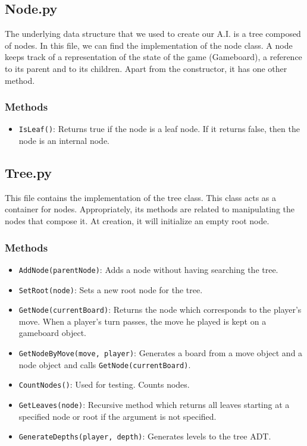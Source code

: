 \documentclass[10pt]{article}
\begin{document}
\subsection{Node.py}
The underlying data structure that we used to create our A.I. is a tree composed of nodes. In this file, we can find the implementation of the node class. A node keeps track of a representation of the state of the game (Gameboard), a reference to its parent and to its children. Apart from the constructor, it has one other method.

\subsubsection*{Methods}
\begin{itemize}
\item \texttt{IsLeaf()}: Returns true if the node is a leaf node. If it returns false, then the node is an internal node.
\end{itemize}

\subsection{Tree.py}
This file contains the implementation of the tree class. This class acts as a container for nodes. Appropriately, its methods are related to manipulating the nodes that compose it. At creation, it will initialize an empty root node.

\subsubsection*{Methods}
\begin{itemize}
    \item \texttt{AddNode(parentNode)}: Adds a node without having searching the tree. 
    \item \texttt{SetRoot(node)}: Sets a new root node for the tree.
    \item \texttt{GetNode(currentBoard)}: Returns the node which corresponds to the player's move. When a player’s turn passes, the move he played is kept on a gameboard object.
    \item \texttt{GetNodeByMove(move, player)}: Generates a board from a move object and a node object and calls \texttt{GetNode(currentBoard)}.
    \item \texttt{CountNodes()}: Used for testing. Counts nodes.
    \item \texttt{GetLeaves(node)}: Recursive method which returns all leaves starting at a specified node or root if the argument is not specified.
    \item \texttt{GenerateDepths(player, depth)}: Generates levels to the tree ADT.
\end{itemize}
\end{document}
